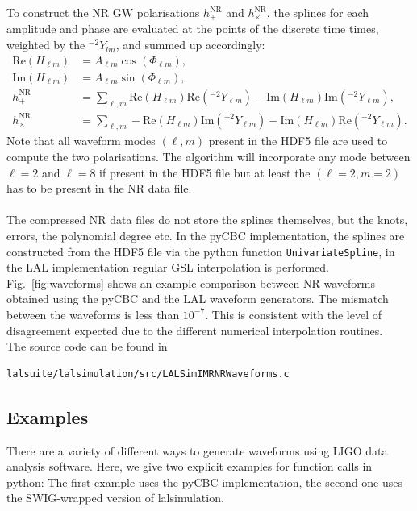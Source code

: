 \documentclass[aps,prd,amssymb,amsmath,amsfonts,superscriptaddress,
floatfix ,preprintnumbers,altaffilletter]{revtex4}
\begin{document}
To construct the NR GW polarisations $h^\mathrm{NR}_+$ and $h^\mathrm{NR}_\times$, the splines for each amplitude and phase are evaluated at the points of the discrete time times, weighted by the ${}^{-2}Y_{lm}$, and summed up accordingly:
\begin{align}
\label{}
    \mathrm{Re}(H_{\ell m}) &= A_{\ell m} \cos(\Phi_{\ell m}),   \\
    \mathrm{Im}(H_{\ell m}) &= A_{\ell m} \sin(\Phi_{\ell m}),   \\
    h^\mathrm{NR}_+ &= \sum_{\ell, m} \mathrm{Re}(H_{\ell m}) \mathrm{Re}({}^{-2}Y_{\ell m}) - \mathrm{Im}(H_{\ell m}) \mathrm{Im}({}^{-2}Y_{\ell m}), \\
    h^\mathrm{NR}_\times &= \sum_{\ell, m} -\mathrm{Re}(H_{\ell m}) \mathrm{Im}({}^{-2}Y_{\ell m}) - \mathrm{Im}(H_{\ell m}) \mathrm{Re}({}^{-2}Y_{\ell m}).
\end{align}
Note that all waveform modes $(\ell, m)$ present in the HDF5 file are used
to compute the two polarisations. The algorithm will incorporate any mode between $\ell =2$ and $\ell =8$ if present in the
HDF5 file but at least the $(\ell=2, m=2)$ has to be present in the NR data file. \\
\\
The compressed NR data files do not store the splines themselves, but the knots, errors, the polynomial degree etc. In the pyCBC implementation,
the splines are constructed from the HDF5 file via the python function \texttt{UnivariateSpline}, in the LAL implementation regular GSL interpolation
is performed. Fig.~\ref{fig:waveforms} shows an example comparison between NR waveforms obtained using the pyCBC and the LAL waveform generators. The mismatch
between the waveforms is less than $10^{-7}$. This is consistent with the level of disagreement expected due to the different numerical interpolation
routines. \\
The source code can be found in
\begin{lstlisting}
lalsuite/lalsimulation/src/LALSimIMRNRWaveforms.c  
\end{lstlisting}

\subsection{Examples}
There are a variety of different ways to generate waveforms using LIGO data analysis software. Here, we give two explicit examples
for function calls in python: The first example uses the pyCBC implementation, the second one uses the SWIG-wrapped version of 
lalsimulation. 
\end{document}
